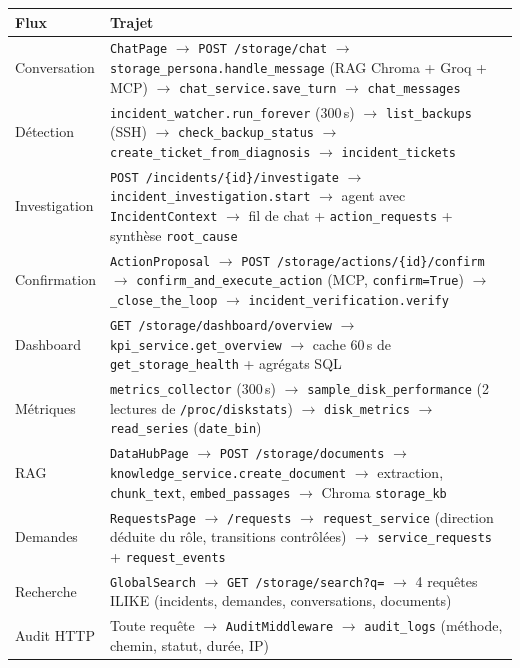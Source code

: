\documentclass[11pt,a4paper]{report}
\newcommand{\fn}[1]{\texttt{\small\textcolor{oasisviolet}{#1}}}
\newcommand{\cls}[1]{\texttt{\small\textcolor{oasisblue}{#1}}}
\newcommand{\tbl}[1]{\texttt{\small\textcolor{oasisamber}{#1}}}
\newcommand{\route}[1]{\texttt{\small\textcolor{oasisgreen}{#1}}}
\newcommand{\arrowto}{\ensuremath{\rightarrow}}
\begin{document}
\begin{longtable}{@{}p{3.4cm}p{11.5cm}@{}}
\toprule
\textbf{Flux} & \textbf{Trajet}\\
\midrule
\endhead
Conversation & \cls{ChatPage} \arrowto{} \route{POST /storage/chat} \arrowto{} \fn{storage\_persona.handle\_message} (RAG Chroma + Groq + MCP) \arrowto{} \fn{chat\_service.save\_turn} \arrowto{} \tbl{chat\_messages}\\
Détection & \fn{incident\_watcher.run\_forever} (300\,s) \arrowto{} \fn{list\_backups} (SSH) \arrowto{} \fn{check\_backup\_status} \arrowto{} \fn{create\_ticket\_from\_diagnosis} \arrowto{} \tbl{incident\_tickets}\\
Investigation & \route{POST /incidents/\{id\}/investigate} \arrowto{} \fn{incident\_investigation.start} \arrowto{} agent avec \cls{IncidentContext} \arrowto{} fil de chat + \tbl{action\_requests} + synthèse \texttt{root\_cause}\\
Confirmation & \cls{ActionProposal} \arrowto{} \route{POST /storage/actions/\{id\}/confirm} \arrowto{} \fn{confirm\_and\_execute\_action} (MCP, \texttt{confirm=True}) \arrowto{} \fn{\_close\_the\_loop} \arrowto{} \fn{incident\_verification.verify}\\
Dashboard & \route{GET /storage/dashboard/overview} \arrowto{} \fn{kpi\_service.get\_overview} \arrowto{} cache 60\,s de \fn{get\_storage\_health} + agrégats SQL\\
Métriques & \fn{metrics\_collector} (300\,s) \arrowto{} \fn{sample\_disk\_performance} (2 lectures de \texttt{/proc/diskstats}) \arrowto{} \tbl{disk\_metrics} \arrowto{} \fn{read\_series} (\texttt{date\_bin})\\
RAG & \cls{DataHubPage} \arrowto{} \route{POST /storage/documents} \arrowto{} \fn{knowledge\_service.create\_document} \arrowto{} extraction, \fn{chunk\_text}, \fn{embed\_passages} \arrowto{} Chroma \texttt{storage\_kb}\\
Demandes & \cls{RequestsPage} \arrowto{} \route{/requests} \arrowto{} \fn{request\_service} (direction déduite du rôle, transitions contrôlées) \arrowto{} \tbl{service\_requests} + \tbl{request\_events}\\
Recherche & \cls{GlobalSearch} \arrowto{} \route{GET /storage/search?q=} \arrowto{} 4 requêtes ILIKE (incidents, demandes, conversations, documents)\\
Audit HTTP & Toute requête \arrowto{} \cls{AuditMiddleware} \arrowto{} \tbl{audit\_logs} (méthode, chemin, statut, durée, IP)\\
\bottomrule
\end{longtable}









\end{document}
